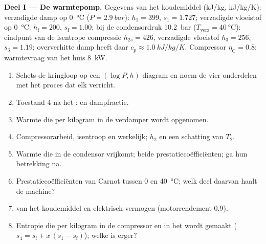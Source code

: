 \begin{problem}\label{pb:b2:open-systems:1}
\textbf{Deel I --- De warmtepomp.}
Gegevens van het koudemiddel (\unit{kJ/kg}, \unit{kJ/kg/K}): verzadigde damp op
\qty{0}{\celsius} ($P = \qty{2.9}{bar}$): $h_1 = 399$, $s_1 = 1.727$;
verzadigde vloeistof op \qty{0}{\celsius}: $h_{\text{f}} = 200$,
$s_{\text{f}} = 1.00$;
bij de condensordruk \qty{10.2}{bar} ($T_{\text{verz}} = \qty{40}{\celsius}$):
eindpunt van de isentrope compressie $h_{2s} = 426$, verzadigde vloeistof
$h_3 = 256$,
$s_3 = 1.19$; oververhitte damp heeft daar $c_p \approx \qty{1.0}{kJ/kg/K}$.
Compressor $\eta_{\text{C}} = 0.8$; warmtevraag van het huis \qty{8}{kW}.
\begin{enumerate}
  \item Schets de kringloop op een $(\log P, h)$-diagram en noem de vier
        onderdelen met het proces dat elk verricht.
  \item Toestand 4 na het :  en dampfractie.
  \item Warmte die per kilogram in de verdamper wordt opgenomen.
  \item Compressorarbeid, isentroop en werkelijk; $h_2$ en een schatting van
        $T_2$.
  \item Warmte die in de condensor vrijkomt; beide prestatiecoëfficiënten; ga hun
        betrekking na.
  \item Prestatiecoëfficiënten van Carnot tussen \qty{0}{} en
        \qty{40}{\celsius}; welk
        deel daarvan haalt de machine?
  \item {} van het koudemiddel en elektrisch vermogen (motor\-rendement
        $0.9$).
  \item Entropie die per kilogram in de compressor en in het
         wordt gemaakt
        ($s_4 = s_{\text{f}} + x\,(s_1 - s_{\text{f}})$); welke is
        erger?
\end{enumerate}


\end{problem}
